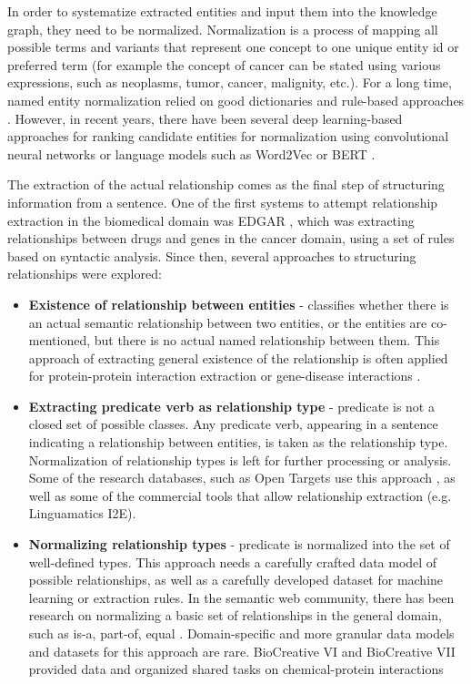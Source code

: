 \documentclass[final,12pt,3p,times,twocolumn,authoryear]{elsarticle}
\begin{document}
In order to systematize extracted entities and input them into the knowledge graph, they need to be normalized. Normalization is a process of mapping all possible terms and variants that represent one concept to one unique entity id or preferred term (for example the concept of cancer can be stated using various expressions, such as neoplasms, tumor, cancer, malignity, etc.).  For a long time, named entity normalization relied on good dictionaries and rule-based approaches \citep{leaman2015tmchem,cohen2005unsupervised}. However, in recent years, there have been several deep learning-based approaches for ranking candidate entities for normalization using convolutional neural networks \citep{li2017cnn,deng2019ensemble} or language models such as Word2Vec \citep{cho2017method} or BERT \citep{ji2020bert}. 

The extraction of the actual relationship comes as the final step of structuring information from a sentence. One of the first systems to attempt relationship extraction in the biomedical domain was EDGAR \citep{rindflesch1999edgar}, which was extracting relationships between drugs and genes in the cancer domain, using a set of rules based on syntactic analysis. Since then, several approaches to structuring relationships were explored: 
\begin{itemize}
    \item \textbf{Existence of relationship between entities} - classifies whether there is an actual semantic relationship between two entities, or the entities are co-mentioned, but there is no actual named relationship between them. This approach of extracting general existence of the relationship is often applied for protein-protein interaction extraction \citep{zitnik2018modeling,szklarczyk2019string} or gene-disease interactions \citep{becker2004genetic}.
    \item \textbf{Extracting predicate verb as relationship type} - predicate is not a closed set of possible classes. Any predicate verb, appearing in a sentence indicating a relationship between entities, is taken as the relationship type. Normalization of relationship types is left for further processing or analysis. Some of the research databases, such as Open Targets use this approach \citep{carvalho2019open}, as well as some of the commercial tools that allow relationship extraction (e.g. Linguamatics I2E). 
    \item \textbf{Normalizing relationship types} - predicate is normalized into the set of well-defined types. This approach needs a carefully crafted data model of possible relationships, as well as a carefully developed dataset for machine learning or extraction rules. In the semantic web community, there has been research on normalizing a basic set of relationships in the general domain, such as is-a, part-of, equal \citep{arnold2015semrep,speer2013conceptnet,speer2017conceptnet}. Domain-specific and more granular data models and datasets for this approach are rare. BioCreative VI and BioCreative VII provided data and organized shared tasks on chemical-protein interactions \citep{krallinger2017overview,krallingerdrugprot}
\end{itemize}
\end{document}
